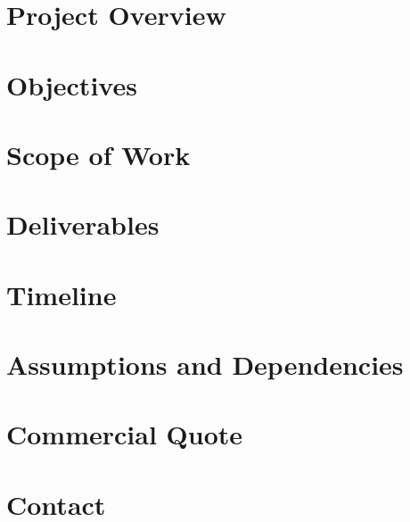 \documentclass[11pt,a4paper]{article}
\begin{document}
\CambiumTitlePage

\section{Project Overview}


\section{Objectives}


\section{Scope of Work}


\section{Deliverables}


\section{Timeline}


\section{Assumptions and Dependencies}


\section{Commercial Quote}


\section{Contact}

\end{document}

